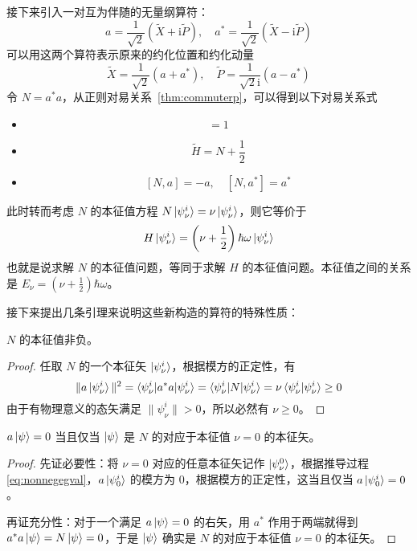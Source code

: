 \documentclass[cn,10pt,math=newtx,citestyle=gb7714-2015,bibstyle=gb7714-2015]{elegantbook}
\def\i{\mathrm i}
\def\td{\tilde}
\begin{document}
接下来引入一对互为伴随的无量纲算符：
\begin{equation}
    a = \frac 1{\sqrt 2}(\td X+\i\td P),\quad a^*=\frac 1{\sqrt 2}(\td X-\i\td P)
\end{equation}
可以用这两个算符表示原来的约化位置和约化动量
\begin{equation}
    \td X = \frac 1{\sqrt 2}(a+a^*),\quad\td P=\frac 1{\sqrt 2\i}(a-a^*)
\end{equation}
令 $N=a^*a$，从正则对易关系~\ref{thm:commuterp}，可以得到以下对易关系式
\begin{itemize}
    \item \begin{equation}
        [a,a^*] = 1
    \end{equation}
    \item \begin{equation}
        \td H = N+\frac 1 2
    \end{equation}
    \item \begin{equation}\label{Nacommute}
        [N,a] = -a,\quad [N,a^*] = a^*
    \end{equation}
\end{itemize}
此时转而考虑 $N$ 的本征值方程 $N\ket{\psi_\nu^i} = \nu\ket{\psi_\nu^i}$，则它等价于
\begin{equation*}
    H\ket{\psi_\nu^i} = \left(\nu+\frac 1 2\right)\hbar\omega\ket{\psi_\nu^i}
\end{equation*}
也就是说求解 $N$ 的本征值问题，等同于求解 $H$ 的本征值问题。本征值之间的关系是 $E_\nu=\left(\nu+\frac 1 2\right)\hbar\omega$。

接下来提出几条引理来说明这些新构造的算符的特殊性质：
\begin{lemma}[$N$ 的半正定性]\label{lem:nonnegegval}
    $N$ 的本征值非负。
\end{lemma}
\begin{proof}
    任取 $N$ 的一个本征矢 $\ket{\psi_\nu^i}$，根据模方的正定性，有
    \begin{equation}
        \label{eq:nonnegegval}
        \|a\ket{\psi_\nu^i}\|^2=\braket
        {\psi_\nu^i|a^*a|\psi_\nu^i}=\braket{\psi_\nu^i|N|\psi_\nu^i}=\nu\braket{\psi_\nu^i|\psi_\nu^i}\ge 0
    \end{equation}
    由于有物理意义的态矢满足 $\|\psi_\nu^i\|> 0$，所以必然有 $\nu\ge 0$。
\end{proof}

\begin{lemma}[降算符的零空间]\label{lem:zeroegval}
    $a\ket{\psi} = 0$ 当且仅当 $\ket{\psi}$ 是 $N$ 的对应于本征值 $\nu=0$ 的本征矢。
\end{lemma}
\begin{proof}
    先证必要性：将 $\nu=0$ 对应的任意本征矢记作 $\ket{\psi_\nu^0}$，根据推导过程 \ref{eq:nonnegegval}，$a\ket{\psi_0^i}$ 的模方为 0，根据模方的正定性，这当且仅当 $a\ket{\psi_0^i} = 0$。
    
    再证充分性：对于一个满足 $a\ket{\psi} = 0$ 的右矢，用 $a^*$ 作用于两端就得到 $a^*a\ket{\psi} = N\ket{\psi} = 0$，于是 $\ket{\psi}$ 确实是 $N$ 的对应于本征值 $\nu=0$ 的本征矢。
\end{proof}
\end{document}
